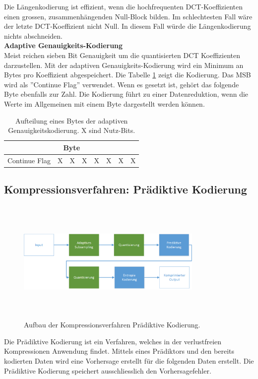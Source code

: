 Die Längenkodierung ist effizient, wenn die hochfrequenten DCT-Koeffizienten einen grossen, zusammenhängenden Null-Block bilden. Im schlechtesten Fall wäre der letzte DCT-Koeffizient nicht Null. In diesem Fall würde die Längenkodierung nichts abschneiden.\\

\textbf{Adaptive Genauigkeits-Kodierung}\\
Meist reichen sieben Bit Genauigkeit um die quantisierten DCT Koeffizienten darzustellen. Mit der adaptiven Genauigkeits-Kodierung wird ein Minimum an Bytes pro Koeffizient abgespeichert. Die Tabelle \ref{konzept:loesung1:entropie:adaptive} zeigt die Kodierung. Das MSB wird als ''Continue Flag'' verwendet. Wenn es gesetzt ist, gehört das folgende Byte ebenfalls zur Zahl. Die Kodierung führt zu einer Datenreduktion, wenn die Werte im Allgemeinen mit einem Byte dargestellt werden können.

\begin{table}[!htbp]
	\center
	\begin{tabular}{|c|c|c|c||c|c|c|c|}
	\hline
	\multicolumn{8}{|c|}{Byte}\\\hline
	Continue Flag & X & X & X & X & X & X & X \\\hline
	\end{tabular}
	\caption{Aufteilung eines Bytes der adaptiven Genauigkeitskodierung. X sind Nutz-Bits.}
	\label{konzept:loesung1:entropie:adaptive}
\end{table}
\pagebreak

\subsection{Kompressionsverfahren: Prädiktive Kodierung} \label{konzept:prediktiv}
\begin{figure}[!htbp]
	\center
	\includegraphics[width=0.8\textwidth,height=6cm,keepaspectratio]{./pictures/konzept/solution2/aufbau.png}
	\caption{Aufbau der Kompressionsverfahren Prädiktive Kodierung.}
	\label{konzept:loesung2:aufbau}
\end{figure}
Die Prädiktive Kodierung ist ein Verfahren, welches in der verlustfreien Kompressionen Anwendung findet. Mittels eines Prädiktors und den bereits kodierten Daten wird eine Vorhersage erstellt für die folgenden Daten erstellt. Die Prädiktive Kodierung speichert ausschliesslich den Vorhersagefehler.

